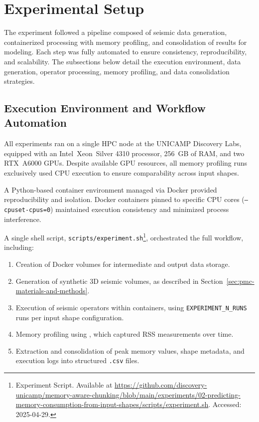 \section{Experimental Setup}
\label{sec:pmc-experimental-setup}

The experiment followed a pipeline composed of seismic data generation, containerized processing with memory profiling, and consolidation of results for modeling.
Each step was fully automated to ensure consistency, reproducibility, and scalability.
The subsections below detail the execution environment, data generation, operator processing, memory profiling, and data consolidation strategies.

\subsection{Execution Environment and Workflow Automation}
\label{subsec:pmc-execution-environment-and-workflow-automation}

All experiments ran on a single \ac{HPC} node at the \ac{UNICAMP} Discovery Labs, equipped with an Intel\textregistered\ Xeon\textregistered\ Silver 4310 processor, 256~\ac{GB} of \ac{RAM}, and two \ac{RTX}~A6000 \ac{GPU}s.
Despite available \ac{GPU} resources, all memory profiling runs exclusively used \ac{CPU} execution to ensure comparability across input shapes.

A Python-based container environment managed via Docker provided reproducibility and isolation.
Docker containers pinned to specific \ac{CPU} cores (\texttt{–cpuset-cpus=0}) maintained execution consistency and minimized process interference.

A single shell script, \texttt{scripts/experiment.sh}\footnote{Experiment Script. Available at \url{https://github.com/discovery-unicamp/memory-aware-chunking/blob/main/experiments/02-predicting-memory-consumption-from-input-shapes/scripts/experiment.sh}. Accessed: 2025-04-29.}, orchestrated the full workflow, including:
\begin{enumerate}
    \item Creation of Docker volumes for intermediate and output data storage.
    \item Generation of synthetic \ac{3D} seismic volumes, as described in Section~\ref{sec:pmc-materials-and-methods}.
    \item Execution of seismic operators within containers, using \texttt{EXPERIMENT\_N\_RUNS} runs per input shape configuration.
    \item Memory profiling using \traceq, which captured \ac{RSS} measurements over time.
    \item Extraction and consolidation of peak memory values, shape metadata, and execution logs into structured \texttt{.csv} files.
\end{enumerate}

